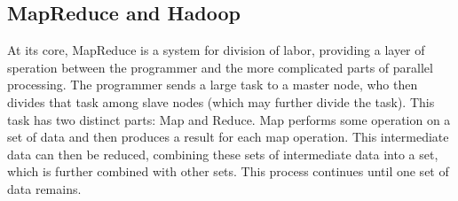 \documentclass[conference, compsocconf, letterpaper]{IEEEtran}
\begin{document}







\subsection{MapReduce and Hadoop}
At its core, MapReduce \cite{mapreduce} is a system for division of labor, providing a layer of speration between the programmer and the more complicated parts of parallel processing.  The programmer sends a large task to a master node, who then divides that task among slave nodes (which may further divide the task).  This task has two distinct parts: Map and Reduce.  Map performs some operation on a set of data and then produces a result for each map operation.  This intermediate data can then be reduced, combining these sets of intermediate data into a set, which is further combined with other sets.  This process continues until one set of data remains.
\end{document}
